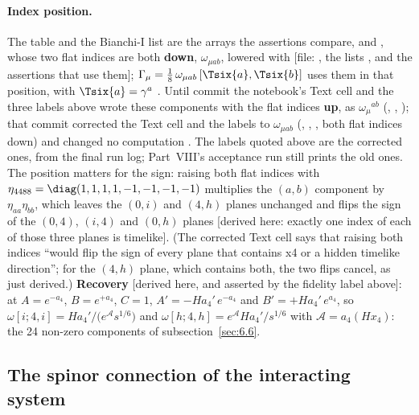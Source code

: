 \paragraph{Index position.} The table and the Bianchi-I list are the arrays the assertions compare,
 and , whose two flat indices are both
\textbf{down}, $\omega_{\mu ab}$, lowered with  [file: ,
the lists ,  and the assertions that use them];
$\Gamma_\mu=\tfrac18\,\omega_{\mu ab}\,[\Tsix{a},\Tsix{b}]$ uses them in that position, with
$\Tsix{a}=\gamma^a$ . Until commit  the notebook's Text cell and the
three labels above wrote these components with the flat indices \textbf{up}, as $\omega_\mu{}^{ab}$
(, , ); that commit corrected the Text cell
and the labels to $\omega_{\mu ab}$ (, , ,
both flat indices down) and changed no computation . The labels quoted above are
the corrected ones, from the final run log; Part~VIII's acceptance run
 still prints the old ones. The position matters for the
sign: raising both flat indices with $\eta_{4488}=\diag(1,1,1,1,-1,-1,-1,-1)$ multiplies the $(a,b)$
component by $\eta_{aa}\eta_{bb}$, which leaves the $(0,i)$ and $(4,h)$ planes unchanged and flips the
sign of the $(0,4)$, $(i,4)$ and $(0,h)$ planes [derived here: exactly one index of each of those three
planes is timelike]. (The corrected Text cell says that raising both indices ``would flip the sign of
every plane that contains x4 or a hidden timelike direction''; for the $(4,h)$ plane, which contains
both, the two flips cancel, as just derived.) \textbf{Recovery} [derived here, and asserted by the fidelity
label above]: at $A=e^{-a_4}$, $B=e^{+a_4}$, $C=1$, $A'=-Ha_4'\,e^{-a_4}$ and $B'=+Ha_4'\,e^{a_4}$, so
$\omega[i;4,i]=Ha_4'/\bigl(e^{\mathcal A}s^{1/6}\bigr)$ and $\omega[h;4,h]=e^{\mathcal A}Ha_4'/s^{1/6}$ with
$\mathcal A=a_4(Hx_4)$: the 24 non-zero components of subsection~\ref{sec:6.6}.

\subsection{The spinor connection of the interacting system}
\label{sec:6.16}

